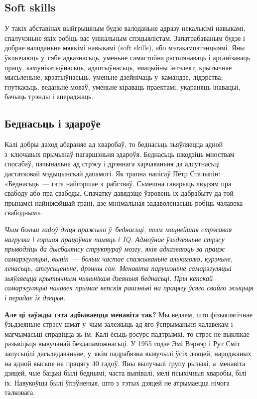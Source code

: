 \subsection*{Soft skills}

У такіх абставінах выйгрышным будзе валоданьне адразу некалькімі навыкамі, спалучэньне якіх робіць вас унікальным спэцыялістам. Запатрабаваным будзе і добрае валоданьне мяккімі навыкамі (soft skills), або мэтакампэтэнцыямі. Яны ўключаюць у~сябе адказнасьць, уменьне самастойна расплянаваць і арганізаваць працу, камунікатыўнасьць, адаптыўнасьць, эмацыйны інтэлект, крытычнае мысьленьне, крэатыўнасьць, уменьне дзейнічаць у~камандзе, лідэрства, гнуткасьць, веданьне моваў, уменьне кіраваць праектамі, укараняць інавацыі, бачыць трэнды і апераджаць.

\subsection*{Беднасьць і здароўе}

Калі добры даход абараняе ад хваробаў, то беднасьць зьяўляецца адной з~ключавых прычынаў пагаршэньня здароўя. Беднасьць шкодзіць мноствам спосабаў, пачынальна ад стрэсу і дрэннага харчаваньня да адсутнасьці дастатковай мэдыцынскай дапамогі. Як трапна напісаў Пётр Сталыпін: «Беднасьць~--- гэта найгоршае з~рабстваў. Сьмешна гаварыць людзям пра свабоду або пра свабоды. Спачатку давядзіце ўзровень іх дабрабыту да той прынамсі найніжэйшай грані, дзе мінімальная задаволенасьць робіць чалавека свабодным».

\emph{Чым больш гадоў дзіця пражыло ў~беднасьці, тым мацнейшая стрэсавая нагрузка і горшая працоўная памяць і IQ. Адмоўнае ўзьдзеяньне стрэсу прыводзіць да дысбалянсу структураў мозгу, якія адказваюць за працэс самарэгуляцыі, вынік~--- больш частае спажываньне алькаголю, курэньне, ленасьць, атлусьценьне, дрэнны сон. Менавіта парушэньне самарэгуляцыі зьяўляецца крытычным чыньнікам дзеяньня беднасьці. Пры кепскай самарэгуляцыі чалавек прымае кепскія рашэньні на працягу ўсяго свайго жыцьця і перадае іх дзецям.}

\textbf{Але ці заўжды гэта адбываецца менавіта так?} Мы ведаем, што фізыялягічнае ўзьдзеяньне стрэсу шмат у~чым залежыць ад яго ўспрыманьня чалавекам і магчымасьці справіцца зь ім. Калі ёсьць рэсурс падтрымкі, то стрэс не выклікае разьвіцьця вывучанай бездапаможнасьці. У 1955 годзе Эмі Вэрнэр і Рут Сміт запусьцілі дасьледаваньне, у~якім падрабязна вывучылі ўсіх дзяцей, народжаных на адной высьпе на працягу 40 гадоў. Яны вылучылі групу рызыкі, а~менавіта дзяцей, чые бацькі былі беднымі, часта выпівалі, мелі псыхічныя хваробы, білі іх. Навукоўцы былі ўпэўненыя, што з~гэтых дзяцей не атрымаецца нічога талковага.

